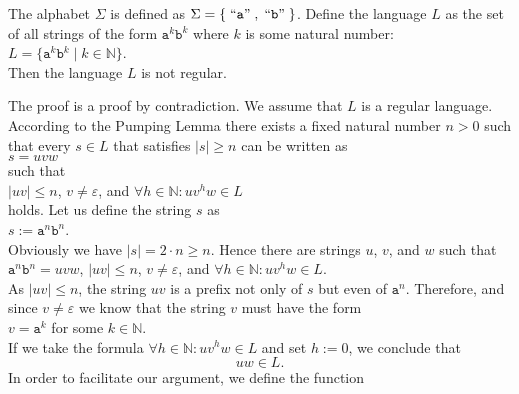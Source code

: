 \begin{Proposition}
  The alphabet  $\Sigma$ is defined as $\Sigma = \{ \;\mbox{``\texttt{a}''}\;, \;\mbox{``\texttt{b}''}\; \}$.
  Define the language $L$ as the set of all strings of the form $\mathtt{a}^k\mathtt{b}^k$ where $k$
  is some natural number:
  \\[0.2cm]
  \hspace*{1.3cm}
  $L = \bigl\{ \mathtt{a}^k\mathtt{b}^k \mid k \in \mathbb{N} \bigr\}$.
  \\[0.2cm]
  Then the language  $L$ is not regular.
\end{Proposition}

\proofEng
The proof is a proof by contradiction. We assume that $L$ is a regular language.  According to the
Pumping Lemma there exists a fixed natural number $n>0$ such that every $s \in L$ that satisfies  $|s|
\geq n$ can be written as
\\[0.2cm]
\hspace*{1.3cm}
$s = uvw$
\\[0.2cm]
such that
\\[0.2cm]
\hspace*{1.3cm}
$|uv| \leq n$, \quad $v \not= \varepsilon$, \quad and \quad $\forall h \in \mathbb{N}: uv^h w \in L$
\\[0.2cm]
holds.  Let us define the string $s$ as
\\[0.2cm]
\hspace*{1.3cm}
$s := \mathtt{a}^{n} \mathtt{b}^{n}$.
\\[0.2cm]
Obviously we have $|s| = 2 \cdot n \geq n$.  Hence there are strings $u$, $v$, and $w$
such that 
\\[0.2cm]
\hspace*{1.3cm}
$\mathtt{a}^{n}\mathtt{b}^{n} = uvw$, \quad $|uv| \leq n$, \quad $v \not= \varepsilon$, 
\quad and \quad $\forall h \in \mathbb{N}: uv^h w \in L$.
\\[0.2cm]
As $|uv| \leq n$, the string $uv$ is a prefix not only of $s$ but even of $\mathtt{a}^n$. Therefore,
and since $v \not= \varepsilon$ we know that the string $v$ must have the form
\\[0.2cm]
\hspace*{1.3cm}
$v = \mathtt{a}^k$ \quad for some $k \in \mathbb{N}$.
\\[0.2cm]
If we take the formula $\forall h \in \mathbb{N}: uv^h w \in L$ and set  $h:=0$, we conclude that
\begin{equation}
  \label{eq:pumping5}
 uw \in L. 
\end{equation}
In order to facilitate our argument, we define the function
